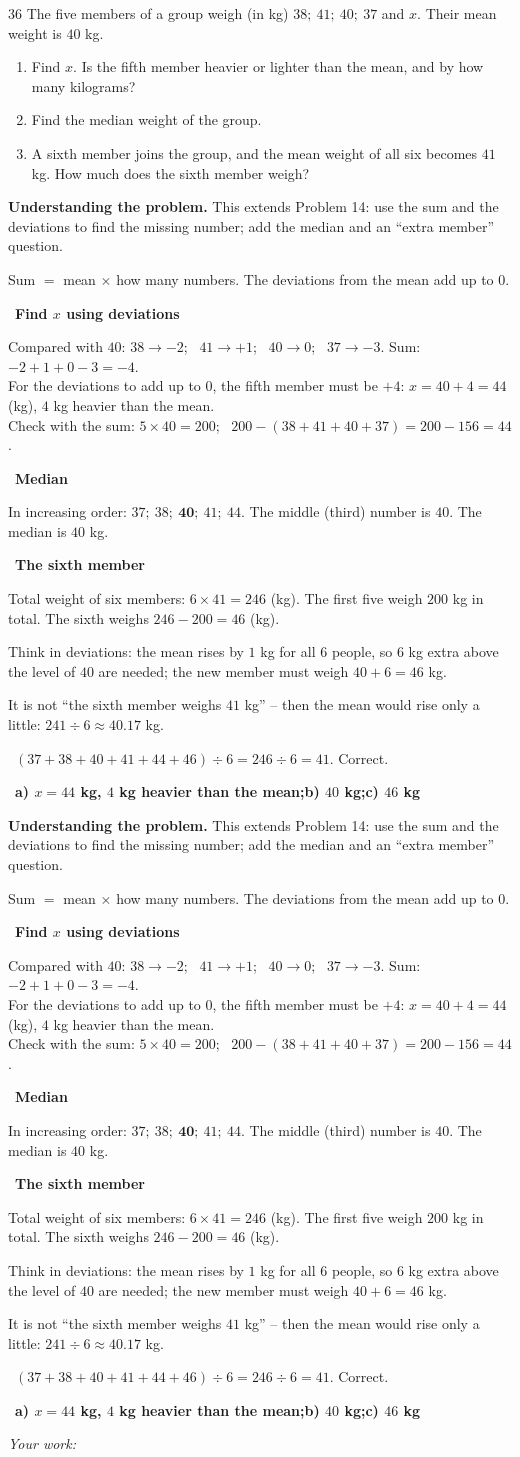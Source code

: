 \documentclass[11pt]{article}
\newif\ifsol \soltrue
\providecommand{\AnsWord}{Đáp số}
\newenvironment{probbox}[2]{\begin{probboxT}{#1}{#2}}{\end{probboxT}}
\newcommand{\StuProb}[2]{\begin{probboxS}{#1}{#2}\StuProbBody\end{probboxS}}
\newcommand{\ans}[1]{\par\smallskip{\bfseries\color{tmGreen!88!black}\AnsWord:}\ {\bfseries\color{AnsRed}#1}\par}
\newcommand{\probsol}[1]{%
  \begin{lrbox}{\solmeasure}\begin{minipage}{\dimexpr\linewidth-24pt\relax}#1\end{minipage}\end{lrbox}%
  \ifsol
    \begin{solbox}#1\end{solbox}%
  \else
    \setlength{\solht}{\dimexpr\ht\solmeasure+\dp\solmeasure+0.85cm\relax}%
    \ifdim\solht<1.35cm\setlength{\solht}{1.35cm}\fi
    \ifdim\solht>\StudentMaxWork\setlength{\solht}{\StudentMaxWork}\fi
    \par\noindent\begin{minipage}{\linewidth}%
    \expandafter\StuProb\StuProbArgs
    \begin{tcolorbox}[colback=white,colframe=Line,boxrule=0.8pt,arc=5pt,
      left=8pt,right=8pt,top=4pt,bottom=4pt,height=\solht]{\footnotesize\color{Slate}\itshape\WorkWord}\end{tcolorbox}%
    \end{minipage}\par\medskip
  \fi}
\newlength{\StudentMaxWork}\setlength{\StudentMaxWork}{4.5cm}
\newcommand{\step}[2]{\par\smallskip\noindent{\bfseries\color{tmBlue!85!black}\StepWord~#1.}\ {\bfseries #2}\par\nopagebreak}
\newcommand{\verify}[1]{\par\smallskip\noindent{\bfseries\color{tmGreen!80!black}\faCheckCircle\ \CheckWord}\ #1\par}
\def\WorkWord{Your work:}
\def\AnsWord{Answer}
\def\StepWord{Step}
\def\CheckWord{Check:}
\begin{document}
\begin{probbox}{36}{\relax}
The five members of a group weigh (in kg) $38;\ 41;\ 40;\ 37$ and $x$. Their mean weight is $40$ kg.
\begin{enumerate}[label=\alph*),leftmargin=1.6em,itemsep=0pt,topsep=2pt]
  \item Find $x$. Is the fifth member heavier or lighter than the mean, and by how many kilograms?
  \item Find the median weight of the group.
  \item A sixth member joins the group, and the mean weight of all six becomes $41$ kg. How much does the sixth member weigh?
\end{enumerate}
\end{probbox}
\probsol{
\textbf{Understanding the problem.} This extends Problem 14: use the sum and the deviations to find the missing number; add
the median and an ``extra member'' question.
\begin{recallbox}Sum $=$ mean $\times$ how many numbers. The deviations from the mean add up to $0$.\end{recallbox}
\step{1}{Find $x$ using deviations}
Compared with $40$: $38 \to -2$; \ $41 \to +1$; \ $40 \to 0$; \ $37 \to -3$. Sum: $-2 + 1 + 0 - 3 = -4$.\\
For the deviations to add up to $0$, the fifth member must be $+4$: $x = 40 + 4 = 44$ (kg), $4$ kg heavier than the mean.\\
Check with the sum: $5\times 40 = 200$; \ $200 - (38 + 41 + 40 + 37) = 200 - 156 = 44$.
\step{2}{Median}
In increasing order: $37;\ 38;\ \mathbf{40};\ 41;\ 44$. The middle (third) number is $40$. The median is $40$ kg.
\step{3}{The sixth member}
Total weight of six members: $6\times 41 = 246$ (kg). The first five weigh $200$ kg in total. The sixth weighs $246 - 200 = 46$ (kg).
\begin{tipbox}Think in deviations: the mean rises by $1$ kg for all $6$ people, so $6$ kg extra above the level of $40$ are needed;
the new member must weigh $40 + 6 = 46$ kg.\end{tipbox}
\begin{warnbox}It is not ``the sixth member weighs $41$ kg'' -- then the mean would rise only a little: $241 \div 6 \approx 40.17$ kg.\end{warnbox}
\verify{$(37 + 38 + 40 + 41 + 44 + 46) \div 6 = 246 \div 6 = 41$. Correct.}
\ans{a) $x = 44$ kg, $4$ kg heavier than the mean;\quad b) $40$ kg;\quad c) $46$ kg}
}
\end{document}
